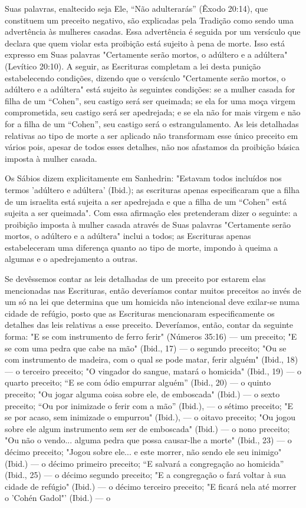 Suas palavras, enaltecido seja Ele, ``Não adulterarás'' (Êxodo 20:14), que
constituem um preceito negativo, são explicadas pela Tradição como
sen­do uma advertência às mulheres casadas. Essa advertência é seguida
por um versículo que declara que quem violar esta proibição está sujeito
à pena de morte. Isso está expresso em Suas palavras "Certamente serão
mortos, o adúltero e a adúltera" (Levítico 20:10). A seguir, as
Escrituras completam a lei desta puni­ção estabelecendo condições,
dizendo que o versículo "Certamente serão mor­tos, o adúltero e a
adúltera" está sujeito às seguintes condições: se a mulher casada for
filha de um ``Cohen'', seu castigo será ser queimada; se ela for uma moça
virgem comprometida, seu castigo será ser apedrejada; e se ela não for
mais virgem e não for a filha de um ``Cohen'', seu castigo será o
estrangulamen­to. As leis detalhadas relativas ao tipo de morte a ser
aplicado não transformam esse único preceito em vários pois, apesar de
todos esses detalhes, não nos afas­tamos da proibição básica imposta à
mulher casada.

Os Sábios dizem explicitamente em Sanhedrin: "Estavam todos in­cluídos
nos termos 'adúltero e adúltera' (Ibid.); as escrituras apenas
especifica­ram que a filha de um israelita está sujeita a ser apedrejada
e que a filha de um ``Cohen'' está sujeita a ser queimada". Com essa
afirmação eles pretenderam dizer o seguinte: a proibição imposta à
mulher casada através de Suas palavras "Certamente serão mortos, o
adúltero e a adúltera" inclui a todos; as Escrituras apenas
estabeleceram uma diferença quanto ao tipo de morte, impondo à quei­ma a
algumas e o apedrejamento a outras.

Se devêssemos contar as leis detalhadas de um preceito por estarem elas
mencionadas nas Escrituras, então deveríamos contar muitos preceitos ao
invés de um só na lei que determina que um homicida não intencional deve
exilar-se numa cidade de refúgio, posto que as Escrituras mencionaram
especi­ficamente os detalhes das leis relativas a esse preceito.
Deveríamos, então, con­tar da seguinte forma: "E se com instrumento de
ferro ferir" (Números 35:16) --- um preceito; "E se com uma pedra que
cabe na mão" (Ibid., 17) --- o segun­do preceito; "Ou se com instrumento
de madeira, com o qual se pode matar, ferir alguém" (Ibid., 18) --- o
terceiro preceito; "O vingador do sangue, matará o homicida" (Ibid., 19)
--- o quarto preceito; ``E se com ódio empurrar alguém'' (Ibid., 20) --- o
quinto preceito; "Ou jogar alguma coisa sobre ele, de embosca­da"
(Ibid.) --- o sexto preceito; ``Ou por inimizade o ferir com a mão''
(Ibid.), --- o sétimo preceito; "E se por acaso, sem inimizade o empurrou"
(Ibid.),  --- o oitavo preceito; "Ou jogou sobre ele algum instrumento sem ser
de emboscada" (Ibid.) --- o nono preceito; "Ou não o vendo... alguma
 pedra que possa causar-lhe a morte" (Ibid., 23) --- o décimo preceito;
 "Jogou sobre ele... e este morrer, não sendo ele seu inimigo" (Ibid.)
 --- o décimo primeiro precei­to; ``E salvará a congregação ao homicida''
 (Ibid., 25) --- o décimo segundo pre­ceito; "E a congregação o fará
 voltar à sua cidade de refúgio" (Ibid.) --- o déci­mo terceiro
 preceito; "E ficará nela até morrer o 'Cohén Gadol"' (Ibid.) --- o
 

